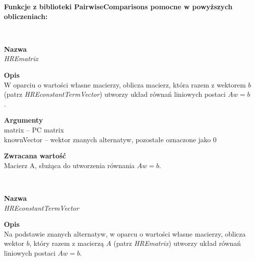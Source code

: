 \textbf{Funkcje z biblioteki PairwiseComparisons pomocne w powyższych obliczeniach:}
\\ 
\begin{spacing}{1.0}
 \\ \begin{spacing}{0.5}  \end{spacing}

\textbf{Nazwa}\\ \emph{HREmatrix} \\ \begin{spacing}{0.3}  \end{spacing}
 
\textbf{Opis}\\ W oparciu o wartości własne macierzy, oblicza macierz, która razem z wektorem $b$ (patrz \textit{HREconstantTermVector}) utworzy układ równań liniowych postaci $Aw = b$.\\  \begin{spacing}{0.3}  \end{spacing}
 
\textbf{Argumenty} \\
matrix -- PC matrix \\
knownVector -- wektor znanych alternatyw, pozostałe oznaczone jako $0$ \\ \begin{spacing}{0.3}  \end{spacing}

\textbf{Zwracana wartość}\\ Macierz A, służąca do utworzenia równania $Aw = b$. \\ \begin{spacing}{0.3}  \end{spacing}

\begin{spacing}{1.2}
 \\ \begin{spacing}{0.5}  \end{spacing}

\textbf{Nazwa}\\  \emph{HREconstantTermVector} \\ \begin{spacing}{0.3}  \end{spacing}
 
\textbf{Opis}\\ Na podstawie znanych alternatyw, w oparcu o wartości własne macierzy, oblicza wektor $b$, który razem z macierzą $A$
(patrz \textit{HREmatrix}) utworzy układ równań liniowych postaci $Aw = b$. \\ \begin{spacing}{0.3}  \end{spacing}
 

\end{spacing}
\end{spacing}
